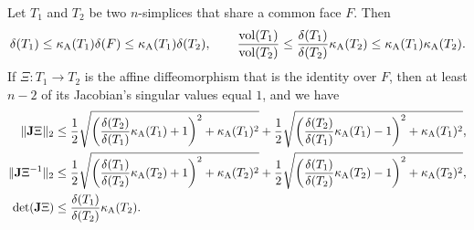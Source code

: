 \documentclass[10pt,a4paper]{article}
\begin{document}
\begin{lemma}\label{lemma:volumecomparison}
    Let $T_1$ and $T_2$ be two $n$-simplices that share a common face $F$. Then 
    \begin{align*}
        {\delta}(T_1)
        \leq 
        \kappa_{\rm A}(T_1)
        {\delta}(F)
        \leq 
        \kappa_{\rm A}(T_1)
        {\delta}(T_2)
        ,
        \qquad 
        \frac{ \operatorname{vol}(T_1) }{ \operatorname{vol}(T_2) }
        \leq 
        \frac{ {\delta}(T_1) }{ {\delta}(T_2) } \kappa_{\rm A}(T_2)
        \leq 
        \kappa_{\rm A}(T_1) \kappa_{\rm A}(T_2)
        .
    \end{align*}
    If $\Xi : T_1 \rightarrow T_2$ is the affine diffeomorphism that is the identity over $F$, then 
    at least $n-2$ of its Jacobian's singular values equal $1$, and we have 
    \begin{align*}
        \|  {\mathbf{J}} \Xi^{  }  \|_{2} 
        &
        \leq 
        \frac{1}{2} 
        \sqrt{ \left( \frac{ {\delta}(T_2) }{ {\delta}(T_1) } \kappa_{\rm A}(T_{1}) + 1 \right)^{2} + \kappa_{\rm A}(T_{1})^{2} }
        +
        \frac{1}{2} 
        \sqrt{ \left( \frac{ {\delta}(T_2) }{ {\delta}(T_1) } \kappa_{\rm A}(T_{1}) - 1 \right)^{2} + \kappa_{\rm A}(T_{1})^{2} }
        ,
        \\
        \|  {\mathbf{J}} \Xi^{-1}  \|_{2} 
        &
        \leq 
        \frac{1}{2} 
        \sqrt{ \left( \frac{ {\delta}(T_1) }{ {\delta}(T_2) } \kappa_{\rm A}(T_{2}) + 1 \right)^{2} + \kappa_{\rm A}(T_{2})^{2} }
        +
        \frac{1}{2} 
        \sqrt{ \left( \frac{ {\delta}(T_1) }{ {\delta}(T_2) } \kappa_{\rm A}(T_{2}) - 1 \right)^{2} + \kappa_{\rm A}(T_{2})^{2} }
        ,
        \\
        \det({\mathbf{J}} \Xi)
        &\leq 
        \frac{ {\delta}(T_1) }{ {\delta}(T_2) } \kappa_{\rm A}(T_2)
        .
    \end{align*}
\end{lemma}
\end{document}
